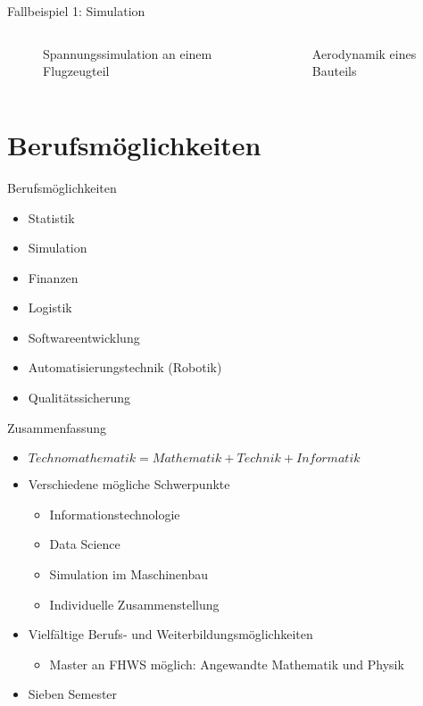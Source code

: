\documentclass[10pt]{beamer}
\begin{document}
\begin{frame}[fragile]{Fallbeispiel 1: Simulation}
  \begin{columns}
    \begin{column}{.5\textwidth}
      \begin{figure}[ht]
        \caption{Spannungssimulation an einem Flugzeugteil}
      \end{figure}
    \end{column}
    \begin{column}{.5\textwidth}
      \begin{figure}[ht]
        \caption{Aerodynamik eines Bauteils}
      \end{figure}
    \end{column}
  \end{columns}
\end{frame}

\section{Berufsmöglichkeiten}

\begin{frame}[fragile]{Berufsmöglichkeiten}
  \begin{itemize}
    \item Statistik
    \item Simulation
    \item Finanzen
    \item Logistik
    \item Softwareentwicklung
    \item Automatisierungstechnik (Robotik)
    \item Qualitätssicherung
  \end{itemize}
\end{frame}

\begin{frame}[fragile]{Zusammenfassung}
  \begin{itemize}
    \item $Technomathematik = Mathematik + Technik + Informatik$
    \item Verschiedene mögliche Schwerpunkte
      \begin{itemize}
        \item Informationstechnologie
        \item Data Science
        \item Simulation im Maschinenbau
        \item Individuelle Zusammenstellung
      \end{itemize}
    \item Vielfältige Berufs- und Weiterbildungsmöglichkeiten
      \begin{itemize}
        \item Master an FHWS möglich: Angewandte Mathematik und Physik
      \end{itemize}
    \item Sieben Semester
  \end{itemize}
\end{frame}
\end{document}
